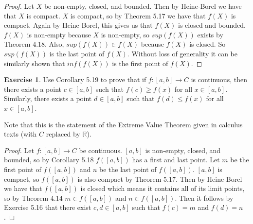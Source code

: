 \documentclass[12pt]{article}
\newcommand{\bbR}{\mathbb{R}}
\providecommand{\arr}{\to}
\renewcommand{\_}[1]{\underline{ #1 }}
\theoremstyle{definition}
\newtheorem{exercise}[theorem]{Exercise}
\numberwithin{equation}{subsection}
\begin{document}
\begin{proof}
Let $X$ be non-empty, closed, and bounded. Then by Heine-Borel we have that $X$ is compact. $X$ is compact, so by Theorem 5.17 we have that $f(X)$ is compact. Again by Heine-Borel, this gives us that $f(X)$ is closed and bounded. $f(X)$ is non-empty because $X$ is non-empty, so $sup(f(X))$ exists by Theorem 4.18. Also, $sup(f(X)) \in f(X)$ because $f(X)$ is closed. So $sup(f(X))$ is the last point of $f(X)$. Without loss of generality it can be similarly shown that $inf(f(X))$ is the first point of $f(X)$.
\end{proof}

\begin{exercise}  Use Corollary 5.19 to prove that  if $f \colon [a,b] \arr C$ is continuous, then there exists a point $c \in [a, b]$ such that $f(c) \geq f(x)$ for all $x \in [a, b]$.  Similarly, there exists a point $d \in [a, b]$ such that $f(d) \leq f(x)$ for all $x \in [a, b]$.

Note that this is the statement of the Extreme Value Theorem given in calculus texts (with $C$ replaced by $\bbR$).
\end{exercise}

\begin{proof}
Let $f : [a,b] \to C$ be continuous. $[a,b]$ is non-empty, closed, and bounded, so by Corollary 5.18 $f([a,b])$ has a first and last point. Let $m$ be the first point of $f([a,b])$ and $n$ be the last point of $f([a,b])$. $[a,b]$ is compact, so $f([a,b])$ is also compact by Theorem 5.17. Then by Heine-Borel we have that $f([a,b])$ is closed which means it contains all of its limit points, so by Theorem 4.14 $m \in f([a,b])$ and $n \in f([a,b])$. Then it follows by Exercise 5.16 that there exist $c,d \in [a,b]$ such that $f(c) = m$ and $f(d) = n$.
\end{proof}
\end{document}
